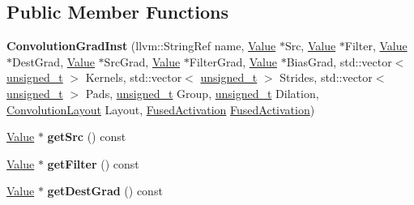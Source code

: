 \subsection*{Public Member Functions}
\begin{DoxyCompactItemize}
\item 
\mbox{\label{classglow_1_1_convolution_grad_inst_a2af780dadd50fa90f15cda5780af3cb3}} 
{\bfseries Convolution\+Grad\+Inst} (llvm\+::\+String\+Ref name, \hyperlink{classglow_1_1_value}{Value} $\ast$Src, \hyperlink{classglow_1_1_value}{Value} $\ast$Filter, \hyperlink{classglow_1_1_value}{Value} $\ast$Dest\+Grad, \hyperlink{classglow_1_1_value}{Value} $\ast$Src\+Grad, \hyperlink{classglow_1_1_value}{Value} $\ast$Filter\+Grad, \hyperlink{classglow_1_1_value}{Value} $\ast$Bias\+Grad, std\+::vector$<$ \hyperlink{namespaceglow_a0ca574644e1e42ef193a9947fb4d8911}{unsigned\+\_\+t} $>$ Kernels, std\+::vector$<$ \hyperlink{namespaceglow_a0ca574644e1e42ef193a9947fb4d8911}{unsigned\+\_\+t} $>$ Strides, std\+::vector$<$ \hyperlink{namespaceglow_a0ca574644e1e42ef193a9947fb4d8911}{unsigned\+\_\+t} $>$ Pads, \hyperlink{namespaceglow_a0ca574644e1e42ef193a9947fb4d8911}{unsigned\+\_\+t} Group, \hyperlink{namespaceglow_a0ca574644e1e42ef193a9947fb4d8911}{unsigned\+\_\+t} Dilation, \hyperlink{namespaceglow_aa2f3a33e05699df0f42295c5c4bd1f77}{Convolution\+Layout} Layout, \hyperlink{namespaceglow_ae88f2cc9ccac93130ee1cc326d968a21}{Fused\+Activation} \hyperlink{namespaceglow_ae88f2cc9ccac93130ee1cc326d968a21}{Fused\+Activation})
\item 
\mbox{\label{classglow_1_1_convolution_grad_inst_a424f9e9dd39660f87985782a188fa055}} 
\hyperlink{classglow_1_1_value}{Value} $\ast$ {\bfseries get\+Src} () const
\item 
\mbox{\label{classglow_1_1_convolution_grad_inst_a1e4ef1855d3e5b4723dc057f377b90d2}} 
\hyperlink{classglow_1_1_value}{Value} $\ast$ {\bfseries get\+Filter} () const
\item 
\mbox{\label{classglow_1_1_convolution_grad_inst_a14e7b7546875ed0ce8099acd9a9cac1e}} 
\hyperlink{classglow_1_1_value}{Value} $\ast$ {\bfseries get\+Dest\+Grad} () const
\item 
\mbox{\label{classglow_1_1_convolution_grad_inst_a36ddc1f4ef740ea4f5c4abcc1ee9a3f7}} 

\end{DoxyCompactItemize}
